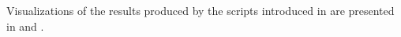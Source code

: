 \documentclass[../paper.tex]{subfiles}
\begin{document}
    Visualizations of the results produced by the scripts introduced in  are presented in  and .

    

    

                
            
            
            
\end{document}
